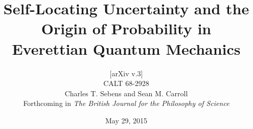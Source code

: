 \documentclass[12pt,onecolumn,secnumarabic,amsmath,amssymb,balancelastpage,nofootinbib]{article}
\begin{document}




\title{Self-Locating Uncertainty and the Origin of Probability in\vspace*{-.1cm}\\Everettian Quantum Mechanics\vspace*{-.3cm}}
\author         {\small{[arXiv v.3]}\vspace*{-.1cm}\\\small{CALT 68-2928}\vspace{0.25cm}\\Charles T. Sebens and Sean M. Carroll\vspace*{0.2cm}\\Forthcoming in \emph{The British Journal for the Philosophy of Science}\vspace{0.1cm}}
\date{May 29, 2015}
\end{document}
